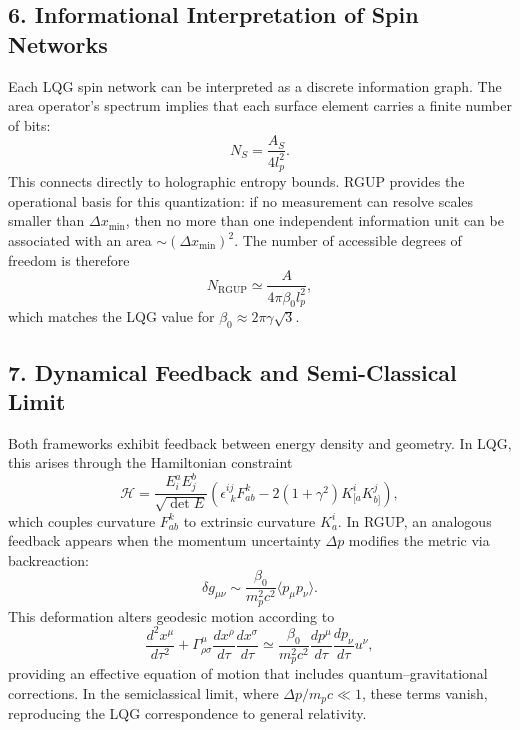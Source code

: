 \documentclass[11pt,oneside]{book}
\numberwithin{equation}{chapter}
\begin{document}
\subsection*{6. Informational Interpretation of Spin Networks}

Each LQG spin network can be interpreted as a discrete information graph.  
The area operator’s spectrum implies that each surface element carries a finite number of bits:
\begin{equation}
N_S = \frac{A_S}{4l_p^2}.
\end{equation}
This connects directly to holographic entropy bounds.  
RGUP provides the operational basis for this quantization: if no measurement can resolve scales smaller than $\Delta x_{\min}$, then no more than one independent information unit can be associated with an area $\sim (\Delta x_{\min})^2$.  
The number of accessible degrees of freedom is therefore
\begin{equation}
N_{\text{RGUP}} \simeq 
\frac{A}{4\pi\beta_0 l_p^2},
\end{equation}
which matches the LQG value for $\beta_0 \approx 2\pi\gamma\sqrt{3}$.

\subsection*{7. Dynamical Feedback and Semi-Classical Limit}

Both frameworks exhibit feedback between energy density and geometry.  
In LQG, this arises through the Hamiltonian constraint
\begin{equation}
\mathcal{H} = 
\frac{E^a_i E^b_j}{\sqrt{\det E}}
\left(
\epsilon^{ij}_{\ \ k} F_{ab}^k
- 2(1+\gamma^2) K_{[a}^i K_{b]}^j
\right),
\end{equation}
which couples curvature $F_{ab}^k$ to extrinsic curvature $K_a^i$.  
In RGUP, an analogous feedback appears when the momentum uncertainty $\Delta p$ modifies the metric via backreaction:
\begin{equation}
\delta g_{\mu\nu} \sim 
\frac{\beta_0}{m_p^2 c^2}
\langle p_\mu p_\nu\rangle.
\end{equation}
This deformation alters geodesic motion according to
\begin{equation}
\frac{d^2x^\mu}{d\tau^2}
+ \Gamma^\mu_{\rho\sigma}
\frac{dx^\rho}{d\tau}\frac{dx^\sigma}{d\tau}
\simeq
\frac{\beta_0}{m_p^2 c^2}
\frac{dp^\mu}{d\tau}
\frac{dp_\nu}{d\tau}u^\nu,
\end{equation}
providing an effective equation of motion that includes quantum–gravitational corrections.  
In the semiclassical limit, where $\Delta p/m_p c \ll 1$, these terms vanish, reproducing the LQG correspondence to general relativity.
\end{document}

